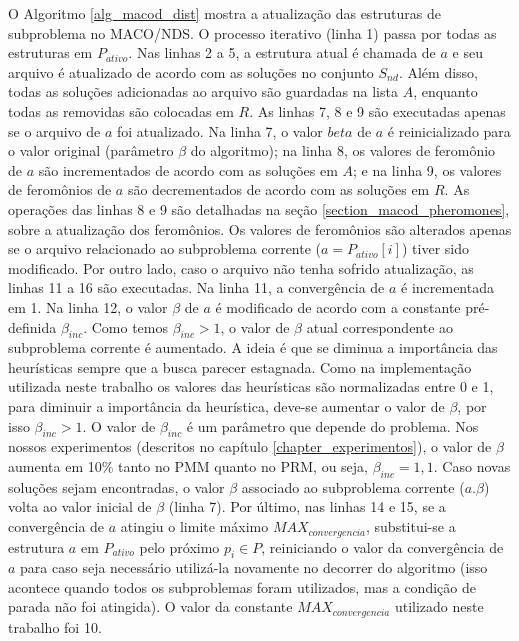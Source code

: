 O Algoritmo \ref{alg_macod_dist} mostra a atualização das estruturas de subproblema no MACO/NDS. O processo iterativo (linha 1) passa por todas as estruturas em $P_{ativo}$. Nas linhas 2 a 5, a estrutura atual é chamada de $a$ e seu arquivo é atualizado de acordo com as soluções no conjunto $S_{nd}$. Além disso, todas as soluções adicionadas ao arquivo são guardadas na lista $A$, enquanto todas as removidas são colocadas em $R$. As linhas 7, 8 e 9 são executadas apenas se o arquivo de $a$ foi atualizado. Na linha 7, o valor $beta$ de $a$ é reinicializado para o valor original (parâmetro $\beta$ do algoritmo); na linha 8, os valores de feromônio de $a$ são incrementados de acordo com as soluções em $A$; e na linha 9, os valores de feromônios de $a$ são decrementados de acordo com as soluções em $R$. As operações das linhas 8 e 9 são detalhadas na seção \ref{section_macod_pheromones}, sobre a atualização dos feromônios. Os valores de feromônios são alterados apenas se o arquivo relacionado ao subproblema corrente ($a = P_{ativo}[i]$) tiver sido modificado. Por outro lado, caso o arquivo não tenha sofrido atualização, as linhas 11 a 16 são executadas. Na linha 11, a convergência de $a$ é incrementada em 1. Na linha 12, o valor $\beta$ de $a$ é modificado de acordo com a constante pré-definida $\beta_{inc}$. Como temos $\beta_{inc} > 1$, o valor de $\beta$ atual correspondente ao subproblema corrente é aumentado. A ideia é que se diminua a importância das heurísticas sempre que a busca parecer estagnada. Como na implementação utilizada neste trabalho os valores das heurísticas são normalizadas entre 0 e 1, para diminuir a importância da heurística, deve-se aumentar o valor de $\beta$, por isso $\beta_{inc} > 1$. O valor de $\beta_{inc}$ é um parâmetro que depende do problema. Nos nossos experimentos (descritos no capítulo \ref{chapter_experimentos}), o valor de $\beta$ aumenta em 10\% tanto no PMM quanto no PRM, ou seja, $\beta_{inc} = 1,1$. Caso novas soluções sejam encontradas, o valor $\beta$ associado ao subproblema corrente ($a.\beta$) volta ao valor inicial de $\beta$ (linha 7). Por último, nas linhas 14 e 15, se a convergência de $a$ atingiu o limite máximo $MAX_{convergencia}$, substitui-se a estrutura $a$ em $P_{ativo}$ pelo próximo $p_i \in P$, reiniciando o valor da convergência de $a$ para caso seja necessário utilizá-la novamente no decorrer do algoritmo (isso acontece quando todos os subproblemas foram utilizados, mas a condição de parada não foi atingida). O valor da constante $MAX_{convergencia}$ utilizado neste trabalho foi 10.

